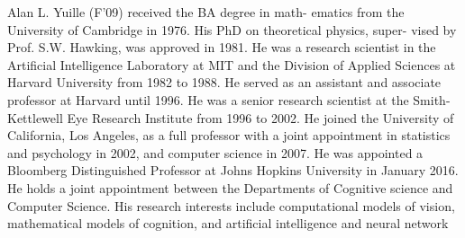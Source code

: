 \documentclass[10pt,journal,compsoc]{IEEEtran}
\begin{document}
\begin{IEEEbiography}{Alan L. Yuille}
(F'09) received the BA degree in math-
ematics from the University of Cambridge in
1976. His PhD on theoretical physics, super-
vised by Prof. S.W. Hawking, was approved
in 1981. He was a research scientist in the
Artificial Intelligence Laboratory at MIT and
the Division of Applied Sciences at Harvard
University  from  1982  to  1988.  He  served
as  an  assistant  and  associate  professor  at
Harvard  until  1996.  He  was  a  senior  research scientist at the Smith-Kettlewell Eye
Research Institute from 1996 to 2002. He joined the University of
California, Los Angeles, as a full professor with a joint appointment
in  statistics  and  psychology  in  2002, and computer  science  in  2007. 
He was appointed a Bloomberg Distinguished Professor at Johns Hopkins University in January 2016.
He holds a joint appointment between the Departments of Cognitive science and Computer Science. 
His  research  interests  include
computational models of vision, mathematical models of cognition,
and artificial intelligence and neural network
\end{IEEEbiography}













 
\end{document}
